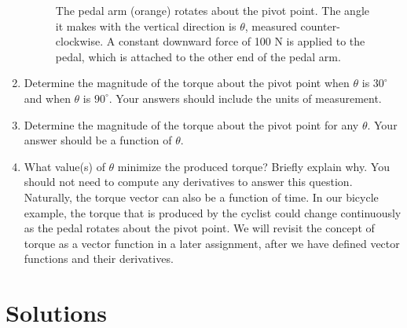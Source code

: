 \documentclass{article}
\begin{document}
\begin{enumerate}
\begin{figure}[!htbp]
\begin{center}
      \caption{\small{The pedal arm (orange) rotates about the pivot point. The angle it makes with the vertical direction is $\theta$, measured counter-clockwise. A constant downward force of 100 N is applied to the pedal, which is attached to the other end of the pedal arm.}}
  \end{center}
\end{figure}
\BEN
  \item Determine the magnitude of the torque about the pivot point when $\theta$ is $30^{\circ}$ and when $\theta$ is $90^{\circ}$. Your answers should include the units of measurement. 
  \item Determine the magnitude of the torque about the pivot point for any $\theta$. Your answer should be a function of $\theta$.  
  \item What value(s) of $\theta$ minimize the produced torque? Briefly explain why. You should not need to compute any derivatives to answer this question. 
\EEN
Naturally, the torque vector can also be a function of time. In our bicycle example, the torque that is produced by the cyclist could change continuously as the pedal rotates about the pivot point. We will revisit the concept of torque as a vector function in a later assignment, after we have defined vector functions and their derivatives. 


\end{enumerate}



\newpage
\section*{Solutions}
\end{document}
